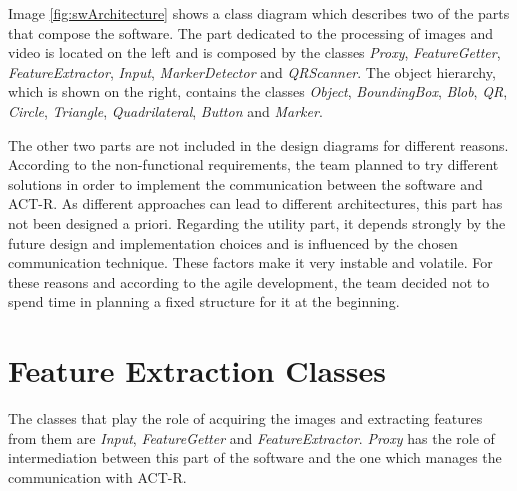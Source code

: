 	Image \ref{fig:swArchitecture} shows a class diagram which describes two of the parts that compose the software. 
	The part dedicated to the processing of images and video is located on the left and is composed by the classes \emph{Proxy}, \emph{FeatureGetter}, \emph{FeatureExtractor}, \emph{Input}, \emph{MarkerDetector} and \emph{QRScanner}.
	The object hierarchy, which is shown on the right, contains the classes \emph{Object}, \emph{BoundingBox}, \emph{Blob}, \emph{QR}, \emph{Circle}, \emph{Triangle}, \emph{Quadrilateral}, \emph{Button} and \emph{Marker}.

	

	The other two parts are not included in the design diagrams for different reasons. 
	According to the non-functional requirements, the team planned to try different solutions in order to implement the communication between the software and ACT-R. As different approaches can lead to different architectures, this part has not been designed a priori.
	Regarding the utility part, it depends strongly by the future design and implementation choices and is influenced by the chosen communication technique. These factors make it very instable and volatile. 
	For these reasons and according to the agile development, the team decided not to spend time in planning a fixed structure for it at the beginning.

	
	
	\section{Feature Extraction Classes}\label{featExtraction}	
	The classes that play the role of acquiring the images and extracting features from them are \emph{Input}, \emph{FeatureGetter} and \emph{FeatureExtractor}. \emph{Proxy} has the role of intermediation between this part of the software and the one which manages the communication with \mbox{ACT-R}.

